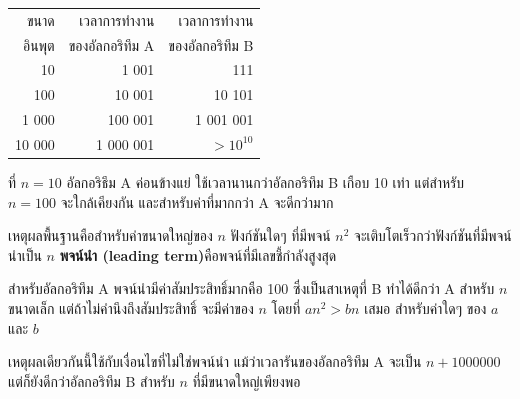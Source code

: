 \begin{tabular}{|r|r|r|}
\hline
ขนาด     &   เวลาการทำงาน     		& เวลาการทำงาน \\
อินพุต     &   ของอัลกอริทึม A		& ของอัลกอริทึม B \\
\hline
10        &   1 001           & 111         \\
100       &   10 001          & 10 101         \\
1 000     &   100 001         & 1 001 001         \\
10 000    &   1 000 001       & $> 10^{10}$         \\
\hline
\end{tabular}


ที่ $n=10$ อัลกอริธึม A ค่อนข้างแย่ ใช้เวลานานกว่าอัลกอริทึม B เกือบ 10 เท่า แต่สำหรับ $n=100$ จะใกล้เคียงกัน และสำหรับค่าที่มากกว่า A จะดีกว่ามาก



เหตุผลพื้นฐานคือสำหรับค่าขนาดใหญ่ของ $n$ ฟังก์ชันใดๆ ที่มีพจน์ $n^2$ จะเติบโตเร็วกว่าฟังก์ชันที่มีพจน์นำเป็น $n$ 
{\bf พจน์นำ (leading term)}คือพจน์ที่มีเลขชี้กำลังสูงสุด


สำหรับอัลกอริทึม A พจน์นำมีค่าสัมประสิทธิ์มากคือ 100 ซึ่งเป็นสาเหตุที่ B ทำได้ดีกว่า A สำหรับ $n$ ขนาดเล็ก 
แต่ถ้าไม่คำนึงถึงสัมประสิทธิ์ จะมีค่าของ $n$ โดยที่ $a n^2 > b n$ เสมอ สำหรับค่าใดๆ ของ $a$ และ $b$


เหตุผลเดียวกันนี้ใช้กับเงื่อนไขที่ไม่ใช่พจน์นำ แม้ว่าเวลารันของอัลกอริทึม A จะเป็น $n+1000000$ 
แต่ก็ยังดีกว่าอัลกอริทึม B สำหรับ $n$ ที่มีขนาดใหญ่เพียงพอ

